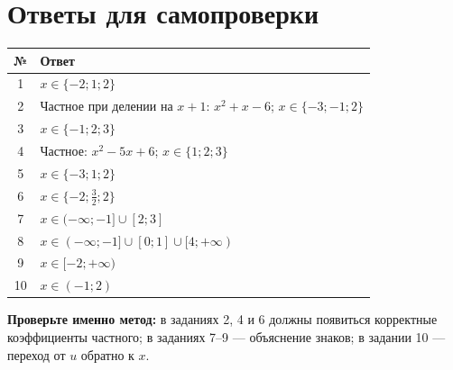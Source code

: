 \documentclass[a4paper,12pt]{article}
\newcommand{\lessonsection}[1]{\vspace{0.35em}\section*{\color{darkaccent}#1}\vspace{-0.75em}{\color{accent}\rule{\linewidth}{0.55pt}}\vspace{0.25em}}
\begin{document}
\clearpage
\lessonsection{Ответы для самопроверки}
\renewcommand{\arraystretch}{1.42}
\begin{tabularx}{\linewidth}{@{}cX@{}}
\toprule
№ & Ответ\\
\midrule
1 & $x\in\{-2;1;2\}$\\
2 & Частное при делении на $x+1$: $x^2+x-6$; $x\in\{-3;-1;2\}$\\
3 & $x\in\{-1;2;3\}$\\
4 & Частное: $x^2-5x+6$; $x\in\{1;2;3\}$\\
5 & $x\in\{-3;1;2\}$\\
6 & $x\in\{-2;\frac32;2\}$\\
7 & $x\in(-\infty;-1]\cup[2;3]$\\
8 & $x\in(-\infty;-1]\cup[0;1]\cup[4;+\infty)$\\
9 & $x\in[-2;+\infty)$\\
10 & $x\in(-1;2)$\\
\bottomrule
\end{tabularx}

\bigskip
\textbf{Проверьте именно метод:} в заданиях 2, 4 и 6 должны появиться корректные коэффициенты частного; в заданиях 7--9 --- объяснение знаков; в задании 10 --- переход от $u$ обратно к $x$.
\end{document}
